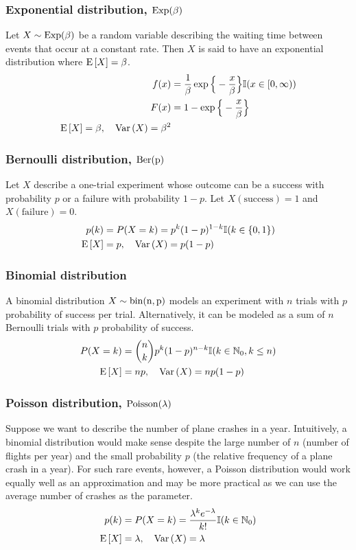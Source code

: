 \documentclass[12pt, notitlepage]{article}
\begin{document}
\subsubsection*{Exponential distribution, $\rm{Exp}(\beta)$}
Let $X \sim \rm{Exp}(\beta)$ be a random variable describing the waiting time between events that occur at a constant rate. Then $X$ is said to have an exponential distribution where $\mathrm{E}\,[X] = \beta$. 
\begin{align*}
f(x) &= \dfrac{1}{\beta} \exp \Big\{ - \dfrac{x}{\beta} \Big\}\mathbb{I}(x \in [0, \infty)) \\
F(x) & = 1 - \exp \Big\{ - \dfrac{x}{\beta} \Big\} \\
\mathrm{E}\,[X] = \beta, \quad \mathrm{Var}\,(X) = \beta^2
\end{align*}

\subsubsection*{Bernoulli distribution, $\rm{Ber}(p)$}
Let $X$ describe a one-trial experiment whose outcome can be a success with probability $p$ or a failure with probability $1-p$. Let $X(\text{success}) = 1$ and $X(\text{failure}) = 0$. 
\begin{align*}
p(k) & = P(X=k) = p^k (1-p)^{1-k} \mathbb{I}(k \in \{0, 1\}) \\
\mathrm{E}\,[X] & = p, \quad \mathrm{Var}\,(X) = p(1-p)
\end{align*}

\subsubsection*{Binomial distribution}
A binomial distribution $X \sim \rm{bin}(n, p)$ models an experiment with $n$ trials with $p$ probability of success per trial. Alternatively, it can be modeled as a sum of $n$ Bernoulli trials with $p$ probability of success. 
\begin{align*}
P(X=k) & = \binom{n}{k}p^k (1-p)^{n-k}\mathbb{I}(k \in \mathbb{N}_0, k \leq n) \\
\mathrm{E}\,[X] & = np, \quad \mathrm{Var}\,(X)  = np(1-p)
\end{align*}


\subsubsection*{Poisson distribution, $\rm{Poisson}(\lambda)$}
Suppose we want to describe the number of plane crashes in a year. Intuitively, a binomial distribution would make sense despite the large number of $n$ (number of flights per year) and the small probability $p$ (the relative frequency of a plane crash in a year). For such rare events, however, a Poisson distribution would work equally well as an approximation and may be more practical as we can use the average number of crashes as the parameter. 
\begin{align*}
p(k) &= P(X =k) = \dfrac{\lambda^k e^{-\lambda}}{k!}\mathbb{I}(k \in \mathbb{N}_0) \\
\mathrm{E}\,[X] &= \lambda, \quad \mathrm{Var}\,(X) = \lambda
\end{align*}
\end{document}
